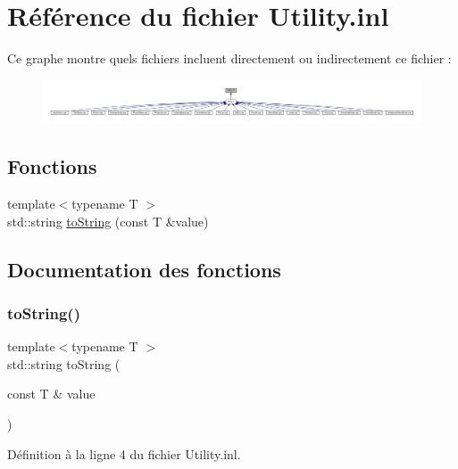 \hypertarget{_utility_8inl}{}\section{Référence du fichier Utility.\+inl}
\label{_utility_8inl}
Ce graphe montre quels fichiers incluent directement ou indirectement ce fichier \+:
\nopagebreak
\begin{figure}[H]
\begin{center}
\leavevmode
\includegraphics[width=350pt]{_utility_8inl__dep__incl}
\end{center}
\end{figure}
\subsection*{Fonctions}
\begin{DoxyCompactItemize}
\item 
{\footnotesize template$<$typename T $>$ }\\std\+::string \hyperlink{_utility_8inl_a1e803cea7d2670ece91f5465281446ba}{to\+String} (const T \&value)
\end{DoxyCompactItemize}


\subsection{Documentation des fonctions}
\hypertarget{_utility_8inl_a1e803cea7d2670ece91f5465281446ba}{}\label{_utility_8inl_a1e803cea7d2670ece91f5465281446ba} 
\subsubsection{\texorpdfstring{to\+String()}{toString()}}
{\footnotesize\ttfamily template$<$typename T $>$ \\
std\+::string to\+String (\begin{DoxyParamCaption}\item[{const T \&}]{value }\end{DoxyParamCaption})}



Définition à la ligne 4 du fichier Utility.\+inl.

